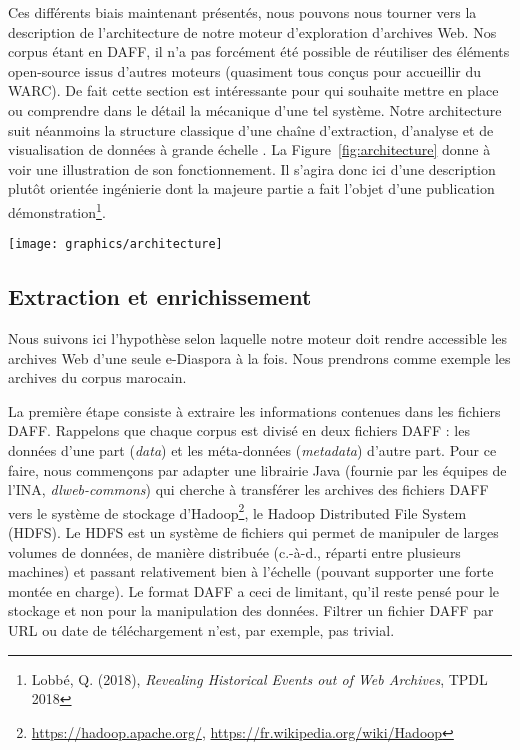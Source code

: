\documentclass[symmetric,justified,marginals=raggedouter]{tufte-book}
\begin{document}
\noindent Ces différents biais maintenant présentés, nous pouvons nous tourner vers la description de l'architecture de notre moteur d'exploration d'archives Web. Nos corpus étant en DAFF, il n'a pas forcément été possible de réutiliser des éléments open-source issus d'autres moteurs (quasiment tous conçus pour accueillir du WARC). De fait cette section est intéressante pour qui souhaite mettre en place ou comprendre dans le détail la mécanique d'une tel système. Notre architecture suit néanmoins la structure classique d'une chaîne d'extraction, d'analyse et de visualisation de données à grande échelle \citep{marz_big_2015}. La Figure~\ref{fig:architecture} donne à voir une illustration de son fonctionnement.  Il s'agira donc ici d'une description plutôt orientée ingénierie dont la majeure partie a fait l'objet d'une publication démonstration\footnote{\RaggedOuter Lobbé, Q. (2018), \textit{Revealing Historical Events out of Web Archives}, TPDL 2018}.

\begin{figure*}%
  \texttt{[image: graphics/architecture]}
  \caption{Architecture de notre moteur d'exploration d'archives Web}
  \label{fig:architecture}
\end{figure*}

\subsection{Extraction et enrichissement}

\noindent Nous suivons ici l'hypothèse selon laquelle notre moteur doit rendre accessible les archives Web d'une seule e-Diaspora à la fois. Nous prendrons comme exemple les archives du corpus marocain.
 
La première étape consiste à extraire les informations contenues dans les fichiers DAFF. Rappelons que chaque corpus est divisé en deux fichiers DAFF : les données d'une part (\textit{data}) et les méta-données (\textit{metadata}) d'autre part. Pour ce faire, nous commençons par adapter une librairie Java (fournie par les équipes de l'INA, \textit{dlweb-commons}) qui cherche à transférer les archives des fichiers DAFF vers le système de stockage d'Hadoop\footnote{\RaggedOuter \url{https://hadoop.apache.org/}, \url{https://fr.wikipedia.org/wiki/Hadoop}}, le Hadoop Distributed File System (HDFS). Le HDFS est un système de fichiers qui permet de manipuler de larges volumes de données, de manière distribuée (c.-à-d., réparti entre plusieurs machines) et passant relativement bien à l'échelle (pouvant supporter une forte montée en charge). Le format DAFF a ceci de limitant, qu'il reste pensé pour le stockage et non pour la manipulation des données. Filtrer un fichier DAFF par URL ou date de téléchargement n'est, par exemple, pas trivial.
\end{document}
